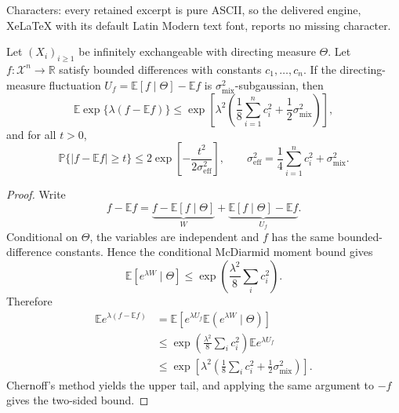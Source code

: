 \documentclass[10pt,a4paper]{amsart}
\newcommand{\E}{\mathbb{E}}
\newcommand{\Pbb}{\mathbb{P}}
\newcommand{\R}{\mathbb{R}}
\begin{document}
Characters: every retained excerpt is pure ASCII, so the delivered engine, XeLaTeX with its default Latin Modern text font, reports no missing character.
\begin{theorem}\label{thm:mcdiarmid-exch}
Let $(X_i)_{i\ge1}$ be infinitely exchangeable with directing measure $\Theta$.  Let $f:\mathcal X^n\to\R$ satisfy bounded differences with constants $c_1,\ldots,c_n$.  If the directing-measure fluctuation $U_f=\E[f\mid\Theta]-\E f$ is $\sigma_{\mathrm{mix}}^2$-subgaussian, then
\[
    \E\exp\{\lambda(f-\E f)\}
    \le
    \exp\!\left[
        \lambda^2
        \left(
            \frac18\sum_{i=1}^n c_i^2
            +
            \frac12\sigma_{\mathrm{mix}}^2
        \right)
    \right],
\]
and for all $t>0$,
\[
    \Pbb\{|f-\E f|\ge t\}
    \le
    2\exp\!\left[
        -\frac{t^2}{2\sigma_{\mathrm{eff}}^2}
    \right],
    \qquad
    \sigma_{\mathrm{eff}}^2
    =
    \frac14\sum_{i=1}^n c_i^2+\sigma_{\mathrm{mix}}^2.
\]
\end{theorem}

\begin{proof}
Write
\[
    f-\E f
    =
    \underbrace{f-\E[f\mid\Theta]}_{W}
    +
    \underbrace{\E[f\mid\Theta]-\E f}_{U_f}.
\]
Conditional on $\Theta$, the variables are independent and $f$ has the same bounded-difference constants.  Hence the conditional McDiarmid moment bound gives
\[
    \E[e^{\lambda W}\mid\Theta]
    \le
    \exp\!\left(\frac{\lambda^2}{8}\sum_i c_i^2\right).
\]
Therefore
\[
\begin{aligned}
\E e^{\lambda(f-\E f)}
&=
\E\!\left[
    e^{\lambda U_f}\E(e^{\lambda W}\mid\Theta)
\right]\\
&\le
\exp\!\left(\frac{\lambda^2}{8}\sum_i c_i^2\right)
\E e^{\lambda U_f}\\
&\le
\exp\!\left[
        \lambda^2
        \left(
            \frac18\sum_i c_i^2
            +
            \frac12\sigma_{\mathrm{mix}}^2
        \right)
    \right].
\end{aligned}
\]
Chernoff's method yields the upper tail, and applying the same argument to $-f$ gives the two-sided bound.
\end{proof}
\end{document}
